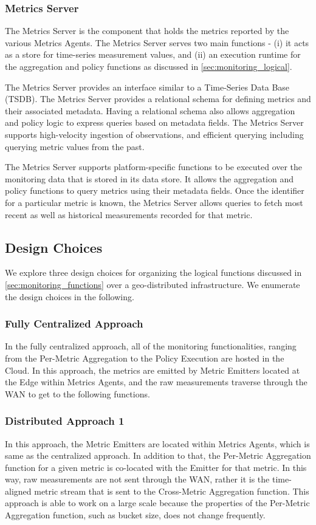 \subsubsection{Metrics Server}
The Metrics Server is the component that holds the metrics reported by the various Metrics Agents. The Metrics Server serves two main functions - (i) it acts as a store for time-series measurement values, and (ii) an execution runtime for the aggregation and policy functions as discussed in \cref{sec:monitoring_logical}. 
\par The Metrics Server provides an interface similar to a Time-Series Data Base (TSDB). The Metrics Server provides a relational schema for defining metrics and their associated metadata. Having a relational schema also allows aggregation and policy logic to express queries based on metadata fields. The Metrics Server supports high-velocity ingestion of observations, and efficient querying including querying metric values from the past.
\par The Metrics Server supports platform-specific functions to be executed over the monitoring data that is stored in its data store. It allows the aggregation and policy functions to query metrics using their metadata fields. Once the identifier for a particular metric is known, the Metrics Server allows queries to fetch most recent as well as historical measurements recorded for that metric.

\subsection{Design Choices}
We explore three design choices for organizing the logical functions discussed in \cref{sec:monitoring_functions} over a geo-distributed infrastructure. We enumerate the design choices in the following.

\subsubsection{Fully Centralized Approach}
In the fully centralized approach, all of the monitoring functionalities, ranging from the Per-Metric Aggregation to the Policy Execution are hosted in the Cloud. In this approach, the metrics are emitted by Metric Emitters located at the Edge within Metrics Agents, and the raw measurements traverse through the WAN to get to the following functions. 

\subsubsection{Distributed Approach 1}
In this approach, the Metric Emitters are located within Metrics Agents, which is same as the centralized approach. In addition to that, the Per-Metric Aggregation function for a given metric is co-located with the Emitter for that metric. In this way, raw measurements are not sent through the WAN, rather it is the time-aligned metric stream that is sent to the Cross-Metric Aggregation function. This approach is able to work on a large scale because the properties of the Per-Metric Aggregation function, such as bucket size, does not change frequently.

